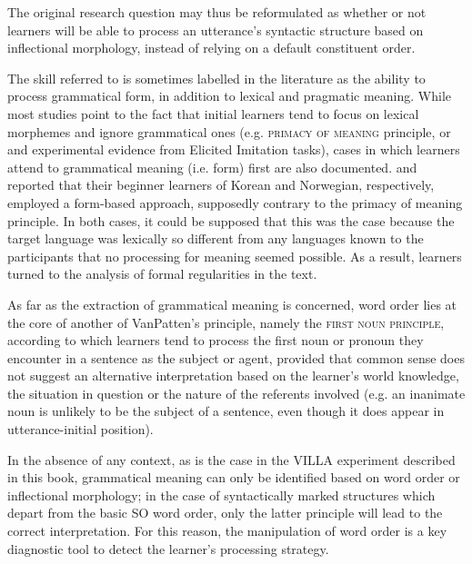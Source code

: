 The original research question may thus be reformulated as whether or not learners will be able to process an utterance’s syntactic structure based on inflectional morphology, instead of relying on a default constituent order. 

The skill referred to is sometimes labelled in the literature as the ability to process grammatical form, in addition to lexical and pragmatic meaning. While most studies point to the fact that initial learners tend to focus on lexical morphemes and ignore grammatical ones (e.g.  \textsc{primacy} \textsc{of} \textsc{meaning} principle, or  and  experimental evidence from Elicited Imitation tasks), cases in which learners attend to grammatical meaning (i.e. form) first are also documented. \citet{Park2013} and \citet{HanPeverly2007} reported that their beginner learners of Korean and Norwegian, respectively, employed a form-based approach, supposedly contrary to the primacy of meaning principle. In both cases, it could be supposed that this was the case because the target language was lexically so different from any languages known to the participants that no processing for meaning seemed possible. As a result, learners turned to the analysis of formal regularities in the text.

As far as the extraction of grammatical meaning is concerned, word order lies at the core of another of VanPatten’s principle, namely the \textsc{first} \textsc{noun} \textsc{principle}, according to which learners tend to process the first noun or pronoun they encounter in a sentence as the subject or agent, provided that common sense does not suggest an alternative interpretation based on the learner’s world knowledge, the situation in question or the nature of the referents involved (e.g. an inanimate noun is unlikely to be the subject of a sentence, even though it does appear in utterance-initial position). 

In the absence of any context, as is the case in the VILLA experiment described in this book, grammatical meaning can only be identified based on word order or inflectional morphology; in the case of syntactically marked structures which depart from the basic SO word order, only the latter principle will lead to the correct interpretation. For this reason, the manipulation of word order is a key diagnostic tool to detect the learner's processing strategy.


